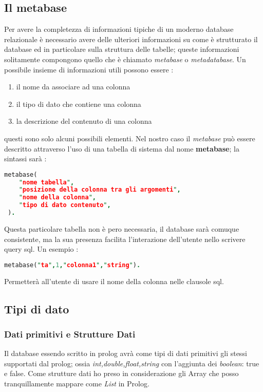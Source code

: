 \subsection{Il metabase}
Per avere la completezza di informazioni tipiche di un moderno database relazionale è necessario avere delle ulteriori informazioni su come è strutturato il database ed in particolare sulla struttura delle tabelle; queste informazioni solitamente compongono quello che è chiamato \emph{metabase} o \emph{metadatabase}. Un possibile insieme di informazioni utili possono essere : 
\begin{enumerate}
\item il nome da associare ad una colonna
\item il tipo di dato che contiene una colonna
\item la descrizione del contenuto di una colonna 
\end{enumerate}
questi sono solo alcuni possibili elementi. Nel nostro caso il \emph{metabase} può essere descritto attraverso l'uso di una tabella di sistema dal nome {\bf metabase}; la sintassi sarà : 
\begin{lstlisting}[language=Prolog,showstringspaces=false]
 metabase(
	"nome tabella",
	"posizione della colonna tra gli argomenti",
	"nome della colonna",
	"tipo di dato contenuto",
 ).
\end{lstlisting}
Questa particolare tabella non è pero necessaria, il database sarà comuque consistente, ma la sua presenza facilita l'interazione dell'utente nello scrivere query sql. Un esempio :
\begin{lstlisting}[language=Prolog,showstringspaces=false]
 metabase("ta",1,"colonna1","string").
\end{lstlisting}
Permetterà all'utente di usare il nome della colonna nelle clausole sql.

\subsection{Tipi di dato}

\subsubsection{Dati primitivi e Strutture Dati}

Il database essendo scritto in prolog avrà come tipi di dati primitivi gli stessi supportati dal prolog; ossia \emph {int,double,float,string} con l'aggiunta dei \emph{boolean}: true e false. 
Come strutture dati ho preso in considerazione gli Array che posso tranquillamente mappare come \emph{List} in Prolog.

